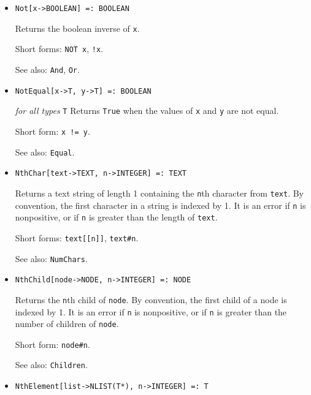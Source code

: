 \begin{itemize}
\item{}
\protect \large \begin{verbatim}
Not[x->BOOLEAN] =: BOOLEAN
\end{verbatim}\normalsize

\bd
Returns the boolean inverse of \verb+x+.
\item [Short forms:] \verb+NOT x+, \verb+!x+.
\item [See also:] \verb+And+, \verb+Or+.
\ed

\item{}
\protect \large \begin{verbatim}
NotEqual[x->T, y->T] =: BOOLEAN
\end{verbatim}\normalsize

{\it for all types} {\tt T}
\bd
Returns \verb+True+ when the values of \verb+x+ and \verb+y+ are
not equal.
\item [Short form:] \verb+x != y+.
\item [See also:] \verb+Equal+.
\ed

\item{}
\protect \large \begin{verbatim}
NthChar[text->TEXT, n->INTEGER] =: TEXT
\end{verbatim}\normalsize

\bd
Returns a text string of length 1 containing the \verb+n+th
character from \verb+text+.  By convention, the first character
in a string is indexed by 1.  It is an error if \verb+n+ is nonpositive,
or if \verb+n+ is greater than the length of \verb+text+.
\item [Short forms:] \verb+text[[n]]+, \verb+text#n+.
\item [See also:] \verb+NumChars+.
\ed

\item{}
\protect \large \begin{verbatim} 
NthChild[node->NODE, n->INTEGER] =: NODE
\end{verbatim}\normalsize

\bd
Returns the \verb+n+th child of \verb+node+.
By convention, the first child of a node is indexed by 1.
It is an error if \verb+n+ is nonpositive, or if \verb+n+ is greater
than the number of children of \verb+node+.
\item [Short form:] \verb+node#n+.
\item [See also:] \verb+Children+.
\ed

\item{}
\protect \large \begin{verbatim}
NthElement[list->NLIST(T*), n->INTEGER] =: T 
\end{verbatim}\normalsize


\end{itemize}
